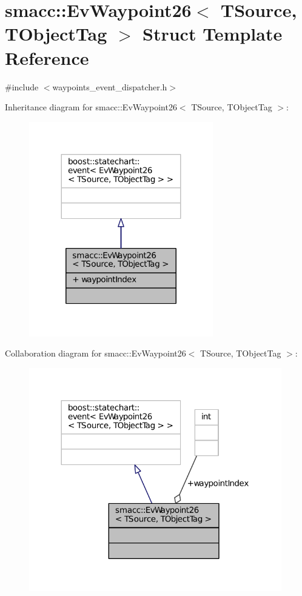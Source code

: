 \hypertarget{structsmacc_1_1EvWaypoint26}{}\section{smacc\+:\+:Ev\+Waypoint26$<$ T\+Source, T\+Object\+Tag $>$ Struct Template Reference}
\label{structsmacc_1_1EvWaypoint26}


{\ttfamily \#include $<$waypoints\+\_\+event\+\_\+dispatcher.\+h$>$}



Inheritance diagram for smacc\+:\+:Ev\+Waypoint26$<$ T\+Source, T\+Object\+Tag $>$\+:
\nopagebreak
\begin{figure}[H]
\begin{center}
\leavevmode
\includegraphics[width=227pt]{structsmacc_1_1EvWaypoint26__inherit__graph}
\end{center}
\end{figure}


Collaboration diagram for smacc\+:\+:Ev\+Waypoint26$<$ T\+Source, T\+Object\+Tag $>$\+:
\nopagebreak
\begin{figure}[H]
\begin{center}
\leavevmode
\includegraphics[width=312pt]{structsmacc_1_1EvWaypoint26__coll__graph}
\end{center}
\end{figure}
